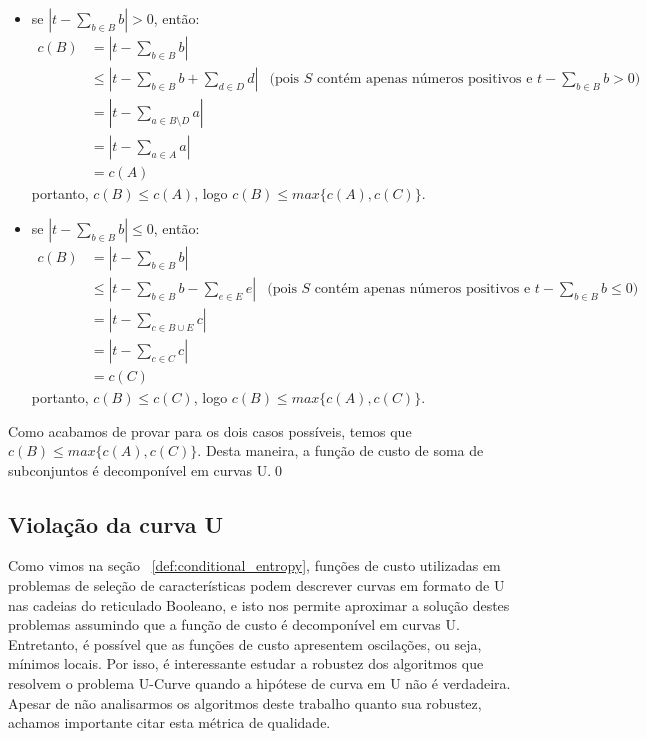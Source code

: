 \begin{itemize}
    \item{se $|t - \sum_{b \in B} b| > 0$, então:}
    \begin{align*}
        c (B) & =  |t - \sum_{b \in B} b|  & \\
              & \leq  |t - \sum_{b \in B} b + \sum_{d \in D} d| & 
                \text{(pois $S$ contém apenas números positivos e $t -
                \sum_{b \in B} b > 0$)} \\
              & = |t - \sum_{a \in B \setminus D} a| \\
              & = |t - \sum_{a \in A} a| \\
              & = c (A)
    \end{align*}
    portanto, $c (B) \leq  c (A)$, logo $c (B) \leq max \{c (A), c (C)\}$.
    
    \item{se $|t - \sum_{b \in B} b| \leq 0$, então:}
    \begin{align*}
        c (B) & =  |t - \sum_{b \in B} b|  & \\
              & \leq  |t - \sum_{b \in B} b - \sum_{e \in E} e| & 
                \text{(pois $S$ contém apenas números positivos e $t -
                \sum_{b \in B} b \leq 0$)} \\
              & = |t - \sum_{c \in B \cup E} c| \\
              & = |t - \sum_{c \in C} c| \\
              & = c (C)
    \end{align*}
    portanto, $c (B) \leq  c (C)$, logo $c (B) \leq max \{c (A), c (C)\}$.
\end{itemize}
Como acabamos de provar para os dois casos possíveis, temos que 
$c (B) \leq max \{c (A), c (C)\}$. Desta maneira, a função de custo de
soma de subconjuntos é decomponível em curvas U.\qed

\subsection{Violação da curva U}
Como vimos na seção ~\ref{def:conditional_entropy}, funções de custo 
utilizadas em problemas de seleção de características podem descrever 
curvas em formato de U nas cadeias do reticulado Booleano, e isto nos 
permite aproximar a solução destes problemas assumindo que a função de 
custo é decomponível em curvas U. Entretanto, é possível que as funções
de custo apresentem oscilações, ou seja, mínimos locais. Por isso, é 
interessante estudar a robustez dos algoritmos que resolvem o problema 
U-Curve quando a hipótese de curva em U não é verdadeira. Apesar de não 
analisarmos os algoritmos deste trabalho quanto sua robustez, achamos 
importante citar esta métrica de qualidade.

